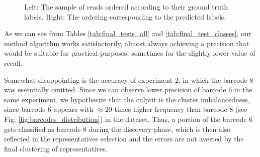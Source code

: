 \begin{figure}[!ht]
    \centering
    \qquad
    \caption[Testing discovery matrices orderings]{Left: The sample of reads ordered according to their ground truth labels. Right: The ordering corresponding to the predicted labels.}%
    \label{fig:test_bad_discovery}
\end{figure}


As we can see from Tables \ref{tab:final_tests_all} and \ref{tab:final_test_classes}, our method algorithm works satisfactorily, almost always achieving a precision that would be suitable for practical purposes, sometimes for the slightly lower value of recall.

Somewhat disappointing is the accuracy of experiment $2$, in which the barcode $8$ was essentially omitted. Since we can observe lower precision of barcode $6$ in the same experiment, we hypothesize that the culprit is the cluster imbalancedness, since barcode $6$ appears with $\approx 20$ times higher frequency than barcode $8$ (see Fig. \ref{fig:barcodes_distribution}) in the dataset. Thus, a portion of the barcode $6$ gets classified as barcode $8$ during the discovery phase, which is then also reflected in the representatives selection and the errors are not averted by the final clustering of representatives.

